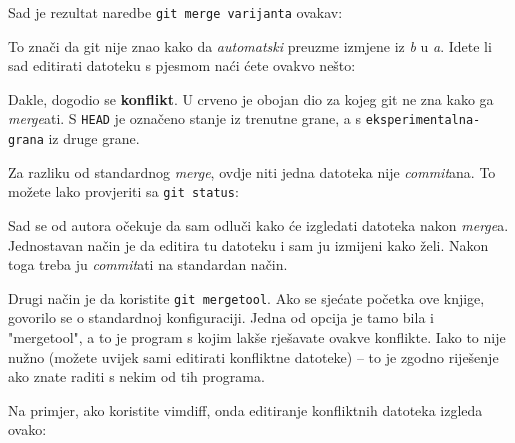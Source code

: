Sad je rezultat naredbe \verb+git merge varijanta+ ovakav:



To znači da git nije znao kako da \emph{automatski} preuzme izmjene iz \emph b u \emph a.
Idete li sad editirati datoteku s pjesmom naći ćete ovakvo nešto:


Dakle, dogodio se \textbf{konflikt}. 
U crveno je obojan dio za kojeg git ne zna kako ga \emph{merge}ati.
S \verb+HEAD+ je označeno stanje iz trenutne grane, a s \verb+eksperimentalna-grana+ iz druge grane.

Za razliku od standardnog \emph{merge}, ovdje niti jedna datoteka nije \emph{commit}ana. 
To možete lako provjeriti sa \verb+git status+:



Sad se od autora očekuje da sam odluči kako će izgledati datoteka nakon \emph{merge}a.
Jednostavan način je da editira tu datoteku i sam ju izmijeni kako želi.
Nakon toga treba ju \emph{commit}ati na standardan način.

Drugi način je da koristite \verb+git mergetool+.
Ako se sjećate početka ove knjige, govorilo se o standardnoj konfiguraciji. 
Jedna od opcija je tamo bila i "mergetool", a to je program s kojim lakše rješavate ovakve konflikte.
Iako to nije nužno (možete uvijek sami editirati konfliktne datoteke) -- to je zgodno riješenje ako znate raditi s nekim od tih programa.

Na primjer, ako koristite vimdiff, onda editiranje konfliktnih datoteka izgleda ovako:

